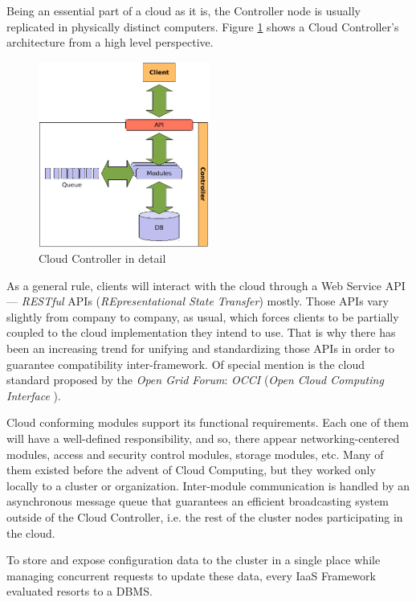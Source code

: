 Being an essential part of a cloud as it is, the Controller node is usually replicated in physically distinct computers. Figure \ref{fig:cloudcontroller} shows a Cloud Controller's architecture from a high level perspective.

\begin{figure}[tbp]
\begin{center}
\includegraphics[width=0.5\textwidth]{imagenes/005.pdf}
 \caption{Cloud Controller in detail}
\label{fig:cloudcontroller}
\end{center}
\end{figure}

As a general rule, clients will interact with the cloud through a Web Service API --- \emph{RESTful} APIs (\emph{REpresentational State Transfer}) mostly. Those APIs vary slightly from company to company, as usual, which forces clients to be partially coupled to the cloud implementation they intend to use. That is why there has been an increasing trend for unifying and standardizing those APIs in order to guarantee compatibility inter-framework. Of special mention is the cloud standard proposed by the \emph{Open Grid Forum}: \emph{OCCI} (\emph{Open Cloud Computing Interface} \cite{occisdraft}).

Cloud conforming modules support its functional requirements. Each one of them will have a well-defined responsibility, and so, there appear networking-centered modules, access and security control modules, storage modules, etc. Many of them existed before the advent of Cloud Computing, but they worked only locally to a cluster or organization. Inter-module communication is handled by an asynchronous message queue that guarantees an efficient broadcasting system outside of the Cloud Controller, i.e. the rest of the cluster nodes participating in the cloud.

To store and expose configuration data to the cluster in a single place while managing concurrent requests to update these data, every IaaS Framework evaluated resorts to a DBMS.

